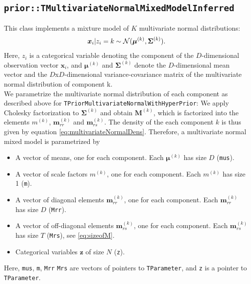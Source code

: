 \documentclass[a4paper,11pt]{article}
\def\M{\boldsymbol{M}}
\def\x{\boldsymbol{x}}
\def\z{\boldsymbol{z}}
\def\bmrr{\boldsymbol m_{rr}}
\def\bmrs{\boldsymbol m_{rs}}
\def\bmu{\boldsymbol{\mu}}
\def\bSigma{\boldsymbol{\Sigma}}
\newcommand{\class}[1]{\texttt{#1}}
\newcommand{\privparam}[1]{\texttt{\textunderscore #1}}
\begin{document}
\subsection{\class{prior::TMultivariateNormalMixedModelInferred}}
This class implements a mixture model of $K$ multivariate normal distributions:
\begin{equation*}
 \x_i | z_i = k \sim {\cal N}(\bmu^{(k)}, \bSigma^{(k)}).
\end{equation*}
Here, $z_i$ is a categorical variable denoting the component of the $D$-dimensional observation vector $\x_i$, and $\bmu^{(k)}$ and $\bSigma^{(k)}$ denote the $D$-dimensional mean vector and the $D$x$D$-dimensional variance-covariance matrix of the multivariate normal distribution of component k. \\
We parametrize the multivariate normal distribution of each component as described above for \class{TPriorMultivariateNormalWithHyperPrior}: We apply Cholesky factorization to $\bSigma^{(k)}$ and obtain $\M^{(k)}$, which is factorized into the elements $m^{(k)}$, $\bmrr^{(k)}$ and $\bmrs^{(k)}$. The density of the each component $k$ is thus given by equation \ref{eq:multivariateNormalDens}. Therefore, a multivariate normal mixed model is parametrized by
\begin{itemize}
  \item A vector of means, one for each component. Each $\bmu^{(k)}$ has size $D$ (\privparam{mus}).
  \item A vector of scale factors $m^{(k)}$, one for each component. Each $m^{(k)}$ has size 1 (\privparam{m}).
  \item A vector of diagonal elements $\bmrr^{(k)}$, one for each component. Each $\bmrr^{(k)}$ has size $D$ (\privparam{Mrr}).
  \item A vector of off-diagonal elements $\bmrs^{(k)}$, one for each component. Each $\bmrs^{(k)}$ has size $T$ (\privparam{Mrs}), see \eqref{eq:sizeofM}.
  \item Categorical variables $\z$ of size $N$ (\privparam{z}).
\end{itemize}
Here, \privparam{mus}, \privparam{m}, \privparam{Mrr} \privparam{Mrs} are vectors of pointers to \class{TParameter}, and \privparam{z} is a pointer to \class{TParameter}.
\end{document}
